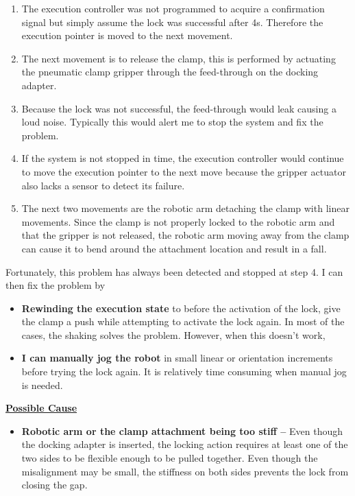 {\begin{enumerate}
	\item The execution controller was not programmed to acquire a confirmation signal but simply assume the lock was successful after 4s. Therefore the execution pointer is moved to the next movement.

	\item The next movement is to release the clamp, this is performed by actuating the pneumatic clamp gripper through the feed-through on the docking adapter.

	\item Because the lock was not successful, the feed-through would leak causing a loud noise. Typically this would alert me to stop the system and fix the problem.

	\item If the system is not stopped in time, the execution controller would continue to move the execution pointer to the next move because the gripper actuator also lacks a sensor to detect its failure.

	\item The next two movements are the robotic arm detaching the clamp with linear movements. Since the clamp is not properly locked to the robotic arm and that the gripper is not released, the robotic arm moving away from the clamp can cause it to bend around the attachment location and result in a fall. 

\end{enumerate}
Fortunately, this problem has always been detected and stopped at step 4. I can then fix the problem by 

\begin{itemize}
	\item \textbf{Rewinding the execution state }to before the activation of the lock, give the clamp a push while attempting to activate the lock again. In most of the cases, the shaking solves the problem. However, when this doesn’t work,

	\item \textbf{I can manually jog the robot} in small linear or orientation increments before trying the lock again. It is relatively time consuming when manual jog is needed.

\end{itemize}
\textbf{\ul{Possible Cause}}

\begin{itemize}
	\item \textbf{Robotic arm or the clamp attachment being too stiff --} Even though the docking adapter is inserted, the locking action requires at least one of the two sides to be flexible enough to be pulled together. Even though the misalignment may be small, the stiffness on both sides prevents the lock from closing the gap.


\end{itemize}}
